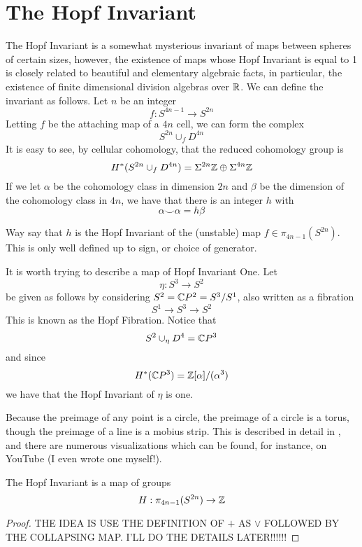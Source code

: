 \section{The Hopf Invariant}

\label{sec:HopfInvariant}

The Hopf Invariant is a somewhat mysterious invariant of maps between spheres of certain sizes, however, the existence of maps whose Hopf Invariant is equal to 1 is closely related to beautiful and elementary algebraic facts, in particular, the existence of finite dimensional division algebras over $\mathbb{R}$.  
We can define the invariant as follows.  
Let $n$ be an integer
\[f:S^{4n-1}\to S^{2n}\]
Letting $f$ be the attaching map of a $4n$ cell, we can form the complex
\[S^{2n}\cup_f D^{4n}\]
It is easy to see, by cellular cohomology, that the reduced cohomology group is
\[H^*(S^{2n}\cup_f D^{4n})=\Sigma^{2n}\mathbb{Z}\oplus \Sigma^{4n}\mathbb{Z}\]
If we let $\alpha$ be the cohomology class in dimension $2n$ and $\beta$ be the dimension of the cohomology class in $4n$, we have that there is an integer $h$ with
\[\alpha\smile\alpha=h\beta\]
\begin{Def}
  Way say that $h$ is the Hopf Invariant of the (unstable) map $f\in \pi_{4n-1}(S^{2n})$.  This is only well defined up to sign, or choice of generator.  
\end{Def}

It is worth trying to describe a map of Hopf Invariant One.
Let
\[\eta : S^3\to S^2\]
be given as follows by considering $S^2=\mathbb{C} P^2=S^3/S^1$, also written as a fibration
\[S^1\to S^3\to S^2\]
This is known as the Hopf Fibration.  
Notice that 
\[S^2\cup_\eta D^4=\mathbb{C} P^3\]
 and since 
\[H^*(\mathbb{C} P^3) = \mathbb{Z}[\alpha]/(\alpha^3)\]
we have that the Hopf Invariant of $\eta$ is one.  

Because the preimage of any point is a circle, the preimage of a circle is a torus, though the preimage of a line is a mobius strip.  This is described in detail in \cite[Example~4.45]{HatcherAT}, and there are numerous visualizations which can be found, for instance, on YouTube (I even wrote one myself!).  


\begin{Lemma}
  The Hopf Invariant is a map of groups 
  \[H:\pi_{4n-1}(S^{2n})\to \mathbb{Z}\]
\end{Lemma}
\begin{proof}
  THE IDEA IS USE THE DEFINITION OF $+$ AS $\vee$ FOLLOWED BY THE COLLAPSING MAP. 
  I'LL DO THE DETAILS LATER!!!!!!
\end{proof}


